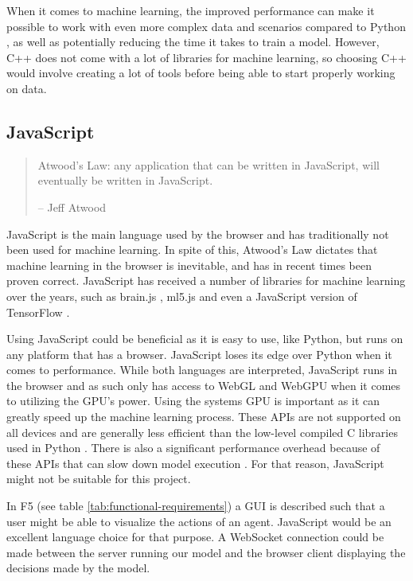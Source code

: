 When it comes to machine learning, the improved performance can make it possible to work with even more complex data and scenarios compared 
to Python \cite{C++VsPythonML}, as well as potentially reducing the time it takes to train a model. However, C++ does not come with a lot of libraries
for machine learning, so choosing C++ would involve creating a lot of tools before being able to start properly working on data.
\clearpage

\subsection{JavaScript}
\begin{quote}
    Atwood's Law: any application that can be written in JavaScript, will eventually be written in JavaScript.
    
    -- Jeff Atwood \cite{AtwoodsLaw}
\end{quote}

JavaScript is the main language used by the browser and has traditionally not been used for machine learning. In spite of this, Atwood's Law \cite{AtwoodsLaw} dictates
that machine learning in the browser is inevitable, and has in recent times been proven correct. JavaScript has received a number of libraries
for machine learning over the years, such as brain.js \cite{BrainJS}, ml5.js \cite{ML5JS} and even a JavaScript version of TensorFlow \cite{TensorFlowJS}.

Using JavaScript could be beneficial as it is easy to use, like Python, but runs on any platform that has a browser. JavaScript loses its edge over Python
when it comes to performance. While both languages are interpreted, JavaScript runs in the browser and as such only has access to WebGL and WebGPU when it comes to utilizing the GPU's power. Using the systems GPU is important as it can greatly speed up the machine learning process. 
These APIs are not supported on all devices and are generally less efficient than the low-level compiled C libraries used in Python \cite{WebGPUvsCUDA}.
There is also a significant performance overhead because of these APIs that can slow down model execution \cite{DeepLearningInBrowsers}. For that reason, JavaScript
might not be suitable for this project.

In F5 (see table \ref{tab:functional-requirements}) a GUI is described such that a user might be able to visualize the actions of an agent. JavaScript would be an 
excellent language choice for that purpose. A WebSocket connection could be made between the server running our model and the browser client displaying
the decisions made by the model.

